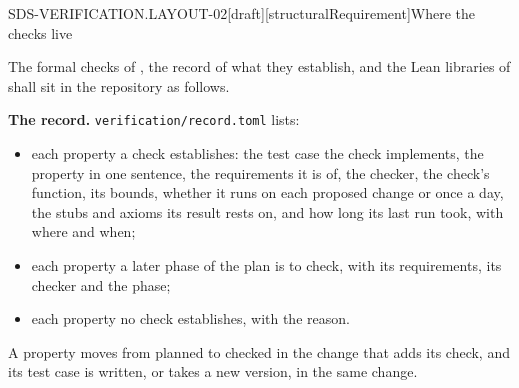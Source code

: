 
\begin{requirement}{SDS-VERIFICATION.LAYOUT-02}[draft][structuralRequirement]{Where the checks live}


  The formal checks of , the record of
  what they establish, and the Lean libraries of
   shall sit in the repository as follows.

  \textbf{The record.} \texttt{verification/record.toml} lists:
  \begin{itemize}
    \item each property a check establishes: the test case the check
      implements, the property in one sentence, the requirements it is of,
      the checker, the check's function, its bounds, whether it runs on each
      proposed change or once a day, the stubs and axioms its result rests
      on, and how long its last run took, with where and when;
    \item each property a later phase of the plan is to check, with its
      requirements, its checker and the phase;
    \item each property no check establishes, with the reason.
  \end{itemize}
  A property moves from planned to checked in the change that adds its
  check, and its test case is written, or takes a new version, in the same
  change.


\end{requirement}
